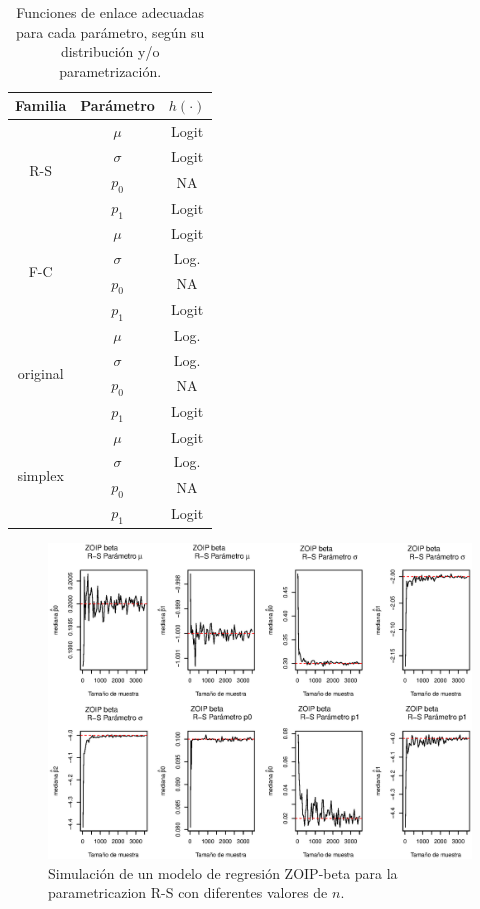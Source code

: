 \begin{table}[!hbt]
{\scriptsize
\begin{center}
\begin{tabular}{|c|c|c|}\hline
Familia & Par\'{a}metro & $h(\cdot)$ \\ \hline
\multirow{4}{*}{R-S \footnotemark[1]} & $\mu$ & Logit \\
 & $\sigma$ & Logit \\
 & $p_0$ & NA \\
 & $p_1$ & Logit \\ \hline

\multirow{4}{*}{F-C \footnotemark[2]} & $\mu$ & Logit \\
 & $\sigma$ & Log. \\
 & $p_0$ & NA \\
 & $p_1$ & Logit \\ \hline

\multirow{4}{*}{original} & $\mu$ & Log. \\
 & $\sigma$ & Log. \\
 & $p_0$ & NA \\
 & $p_1$ & Logit \\ \hline

\multirow{4}{*}{simplex} & $\mu$ & Logit \\
 & $\sigma$ & Log. \\
 & $p_0$ & NA \\
 & $p_1$ & Logit \\ \hline

\end{tabular}
\caption{Funciones de enlace adecuadas para cada par\'{a}metro, seg\'{u}n su distribuci\'{o}n y/o parametrizaci\'{o}n.}
\label{T_F_enlace}
\end{center}
}
\end{table}

\begin{figure}
	\begin{center}
		\includegraphics[scale=0.5]{Converg_RS.eps}	
		\caption{Simulaci\'{o}n de un modelo de regresi\'{o}n ZOIP-beta para la parametricazion R-S con diferentes valores de $n$.}
		\label{Simu_RS}
	\end{center}
\end{figure}

